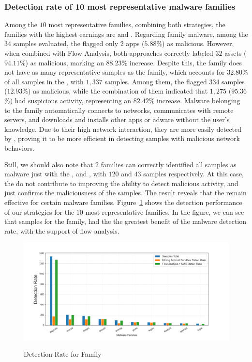 \subsubsection{Detection rate of 10 most representative malware families}\label{sec:familyDetection}

Among the $10$ most representative families, combining both strategies, the families with the highest earnings are \tjk and \gps. Regarding \tjk family malware, among the 34 samples evaluated, the \fhc flagged only 2 apps ($5.88$\%) as malicious. However, when combined with Flow Analysis, both approaches correctly labeled $32$ assets ($94.11$\%) as malicious, marking an $88.23$\% increase. Despite this, the \tjk family does not have as many representative samples as the \gps family, which accounts for $32.80$\% of all samples in the \cds, with $1,337$ samples. Among them, the \mas flagged $334$ samples ($12.93$\%) as malicious, while the combination of them indicated that $1,275$ ($95.36$\%) had suspicious activity, representing an $82.42$\% increase. Malware belonging to the \gps family automatically connects to networks, communicates with remote servers, and downloads and installs other apps or adware without the user’s knowledge\cite{DBLP:journals/jnca/WangCYYPJ19}. Due to their high network interaction, they are more easily detected by \net, proving it to be more efficient in detecting samples with malicious network behaviors.

Still, we should also note that $2$ families can correctly identified all samples as malware just with the \mas,  and , with $120$ and $43$ samples respectively. At this case, the \net do not contribute to improving the ability to detect malicious activity, and just confirms the  maliciousness of the samples. The result reveals that the \mas remain effective for certain malware families. Figure~\ref{fig:bar} shows the detection performance of our strategies for the $10$ most representative families. In the figure, we can see that samples for the \gps family, had the the greatest benefit of the malware detection rate, with the support of flow analysis.



\begin{figure}[h]
  \centering
  
    \includegraphics[width=\linewidth]{image/barGraph.png} \\[\abovecaptionskip]
    
  \caption{Detection Rate for Family}\label{fig:bar}
\end{figure}

